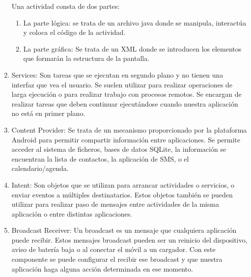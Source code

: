 \begin{enumerate}
Una actividad consta de dos partes:
\begin{enumerate}
\item	La parte lógica: se trata de un archivo java donde se manipula,
 interactúa y coloca el código de la actividad.
\item	La parte gráfica: Se trata de un XML donde se introducen los
 elementos que formarán la estructura de la pantalla.
\end{enumerate}
\item	Services: Son tareas que se ejecutan en segundo plano y no
 tienen una interfaz que vea el usuario. Se suelen utilizar para realizar 
operaciones de larga ejecución o para realizar trabajo con procesos remotos.
Se encargan de realizar tareas que deben continuar ejecutándose 
cuando nuestra aplicación no está en primer plano.
\item	Content Provider: Se trata de un mecanismo proporcionado
 por la plataforma Android para permitir compartir información entre 
aplicaciones. Se permite acceder al sistema de ficheros, bases de 
datos SQLite, la información se encuentran la lista de contactos, la 
aplicación de SMS, o el calendario/agenda.  
\item	Intent: Son objetos que se utilizan para arrancar actividades o 
servicios, o enviar eventos a múltiples destinatarios. Estos objetos 
también se pueden utilizar para realizar paso de mensajes entre 
actividades de la misma aplicación o entre distintas aplicaciones.
\item Broadcast Receiver: Un broadcast es un mensaje que cualquiera 
aplicación puede recibir. Estos mensajes broadcast pueden ser 
un reinicio del dispositivo, aviso de batería baja o al conectar el
 móvil a un cargador. Con este componente se puede configurar
 el recibir ese broadcast y que nuestra aplicación haga alguna acción 
determinada en ese momento.
\end{enumerate}
